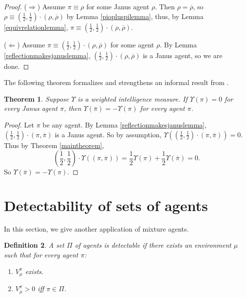 \documentclass[twoside]{article}
\newtheorem{theorem}{Theorem}
\newtheorem{definition}[theorem]{Definition}
\begin{document}
\begin{proof}
    ($\Rightarrow$)
    Assume $\pi\equiv\rho$ for some Janus agent $\rho$.
    Then $\rho=\overline{\rho}$, so
    $\rho\equiv (\frac12,\frac12)\cdot(\rho,\overline{\rho})$ by
    Lemma \ref{piopluspilemma}, thus, by Lemma \ref{equivrelationlemma},
    $\pi\equiv(\frac12,\frac12)\cdot(\rho,\overline{\rho})$.

    ($\Leftarrow$)
    Assume $\pi\equiv(\frac12,\frac12)\cdot(\rho,\overline{\rho})$ for some agent $\rho$.
    By Lemma \ref{reflectionmakesjanuslemma},
    $(\frac12,\frac12)\cdot(\rho,\overline{\rho})$ is a Janus agent, so we are done.
\end{proof}

The following theorem formalizes and strengthens an informal result
from \cite{alexander2021reward}.

\begin{theorem}
    Suppose $\Upsilon$ is a weighted intelligence measure.
    If $\Upsilon(\pi)=0$ for every Janus agent $\pi$,
    then $\Upsilon(\overline{\pi})=-\Upsilon(\pi)$
    for every agent $\pi$.
\end{theorem}

\begin{proof}
    Let $\pi$ be any agent.
    By Lemma \ref{reflectionmakesjanuslemma},
    $(\frac12,\frac12)\cdot(\pi,\overline\pi)$ is a Janus agent.
    So by assumption,
    $\Upsilon((\frac12,\frac12)\cdot(\pi,\overline\pi))=0$.
    Thus by Theorem \ref{maintheorem},
    \[
        (\mbox{$\frac12$},\mbox{$\frac12$})\cdot\Upsilon((\pi,\overline\pi))
        =\mbox{$\frac12$}\Upsilon(\pi)+\mbox{$\frac12$}\Upsilon(\overline\pi)=0.
    \]
    So $\Upsilon(\overline{\pi})=-\Upsilon(\pi)$.
\end{proof}


\section{Detectability of sets of agents}

In this section, we give another application of mixture agents.

\begin{definition}
\label{incentivizabilitydefn}
    A set $\Pi$ of agents is \emph{detectable} if there exists
    an environment $\mu$ such that for every agent $\pi$:
    \begin{enumerate}
        \item
        $V^\pi_\mu$ exists.
        \item
        $V^\pi_\mu>0$ iff $\pi\in\Pi$.
    \end{enumerate}
\end{definition}
\end{document}
